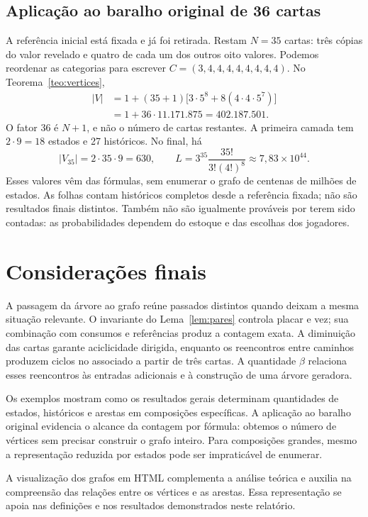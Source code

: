 \documentclass[11pt,a4paper]{article}
\theoremstyle{definition}
\begin{document}
\subsection{Aplicação ao baralho original de 36 cartas}
A referência inicial está fixada e já foi retirada. Restam $N=35$ cartas: três cópias do valor revelado e quatro de cada um dos outros oito valores. Podemos reordenar as categorias para escrever $C=(3,4,4,4,4,4,4,4,4)$. No Teorema~\ref{teo:vertices},
\begin{align*}
|V|&=1+(35+1)\bigl[3\cdot5^8+8(4\cdot4\cdot5^7)\bigr]\\
&=1+36\cdot11.171.875=402.187.501.
\end{align*}
O fator 36 é $N+1$, e não o número de cartas restantes. A primeira camada tem $2\cdot9=18$ estados e 27 históricos. No final, há
\[
|V_{35}|=2\cdot35\cdot9=630,
\qquad
L=3^{35}\frac{35!}{3!(4!)^8}\approx7{,}83\times10^{44}.
\]
Esses valores vêm das fórmulas, sem enumerar o grafo de centenas de milhões de estados. As folhas contam históricos completos desde a referência fixada; não são resultados finais distintos. Também não são igualmente prováveis por terem sido contadas: as probabilidades dependem do estoque e das escolhas dos jogadores.

\section{Considerações finais}
A passagem da árvore ao grafo reúne passados distintos quando deixam a mesma situação relevante. O invariante do Lema~\ref{lem:pares} controla placar e vez; sua combinação com consumos e referências produz a contagem exata. A diminuição das cartas garante aciclicidade dirigida, enquanto os reencontros entre caminhos produzem ciclos no associado a partir de três cartas. A quantidade $\beta$ relaciona esses reencontros às entradas adicionais e à construção de uma árvore geradora.

Os exemplos mostram como os resultados gerais determinam quantidades de estados, históricos e arestas em composições específicas. A aplicação ao baralho original evidencia o alcance da contagem por fórmula: obtemos o número de vértices sem precisar construir o grafo inteiro. Para composições grandes, mesmo a representação reduzida por estados pode ser impraticável de enumerar.

A visualização dos grafos em HTML complementa a análise teórica e auxilia na compreensão das relações entre os vértices e as arestas. Essa representação se apoia nas definições e nos resultados demonstrados neste relatório.
\end{document}

